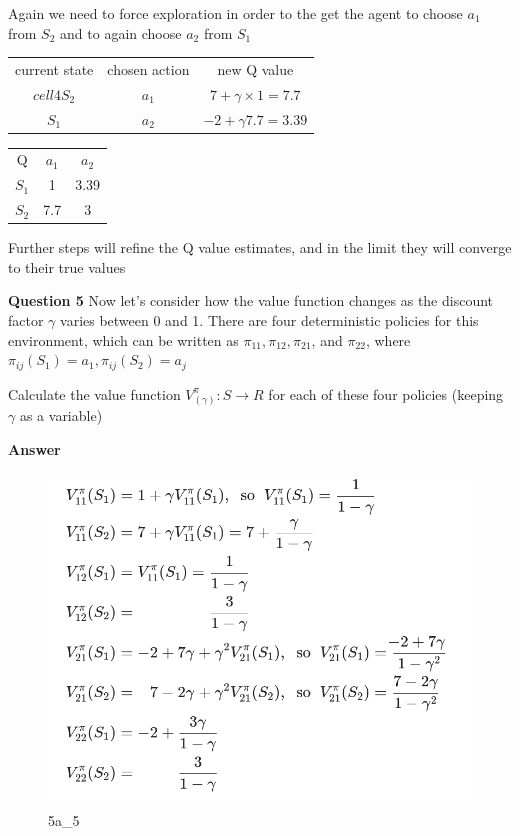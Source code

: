 \documentclass[11pt]{article}
\begin{document}
Again we need to force exploration in order to the get the agent to choose $a_1$
from $S_2$ and to again choose $a_2$ from $S_1$

\begin{center}
\begin{tabular}{ c c c }
 current state & chosen action & new Q value \\
 $cell4S_2$ & $a_1$ & $7 + \gamma \times 1 = 7.7$ \\
 $S_1$ & $a_2$ & $-2 + \gamma 7.7 = 3.39$
\end{tabular}
\end{center}

\begin{center}
\begin{tabular}{ c c c }
 Q & $a_1$ & $a_2$ \\
 $S_1$ & 1 & 3.39 \\
 $S_2$ & 7.7 & 3
\end{tabular}
\end{center}

Further steps will refine the Q value estimates, and in the limit they will
converge to their true values

\textbf{Question 5}
Now let's consider how the value function changes as the discount factor $\gamma$
varies between 0 and 1.
There are four deterministic policies for this environment, which can be
written as $\pi_{11}, \pi_{12}, \pi_{21}$, and $\pi_{22}$, where
$\pi_{ij} (S_1) = a_1, \pi_{ij}(S_2) = a_j$

Calculate the value function $V_{(\gamma)}^{\pi}: S \to R$ for each of these
four policies (keeping $\gamma$ as a variable)

\textbf{Answer}
\begin{figure}[h]
    \centering
    \includegraphics[width=\textwidth]{../out/images/5a_5}
    \caption[5a\_5]{5a\_5}
    \label{fig:5a_5}
\end{figure}
\end{document}

